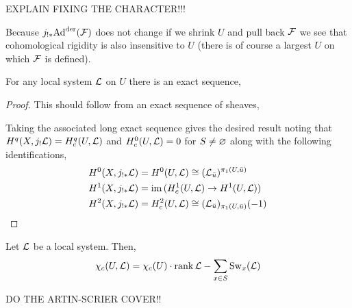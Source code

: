 \documentclass[12pt]{article}
\begin{document}
\begin{rmk}
EXPLAIN FIXING THE CHARACTER!!!
\end{rmk}

\begin{rmk}
Because $j_{!*} \mathrm{Ad}^{\mathrm{der}}(\mathcal{F})$ does not change if we shrink $U$ and pull back $\mathcal{F}$ we see that cohomological rigidity is also insensitive to $U$ (there is of course a largest $U$ on which $\mathcal{F}$ is defined). 
\end{rmk}

\begin{lemma}
For any local system $\mathcal{L}$ on $U$ there is an exact sequence,
\begin{center}
\end{center}
\end{lemma}

\begin{proof}
This should follow from an exact sequence of sheaves,
\begin{center}
\end{center}
Taking the associated long exact sequence gives the desired result noting that $H^q(X, j_! \mathcal{L}) = H^q_c(U, \mathcal{L})$ and $H^0_c(U, \mathcal{L}) = 0$ for $S \neq \varnothing$ along with the following identifications,
\begin{align*}
H^0(X, j_{!*} \mathcal{L}) & = H^0(U, \mathcal{L}) \cong (\mathcal{L}_{\bar{u}})^{\pi_1(U, \bar{u})}
\\
H^1(X, j_{!*} \mathcal{L} ) & = \operatorname{\mathrm{im}}{(H^1_c(U, \mathcal{L}) \to H^1(U, \mathcal{L}))} 
\\
H^2(X, j_{!*} \mathcal{L}) & = H^2_c(U, \mathcal{L}) \cong (\mathcal{L}_{\bar{u}})_{\pi_1(U, \bar{u})}(-1)
\end{align*}
\end{proof}

\begin{thm}
Let $\mathcal{L}$ be a local system. Then,
\[ \chi_c(U, \mathcal{L}) = \chi_c(U) \cdot \operatorname{\mathrm{rank}}{\mathcal{L}} - \sum_{x \in S} \mathrm{Sw}_x(\mathcal{L}) \]
\end{thm}

\begin{example}
DO THE ARTIN-SCRIER COVER!!
\end{example}
\end{document}
